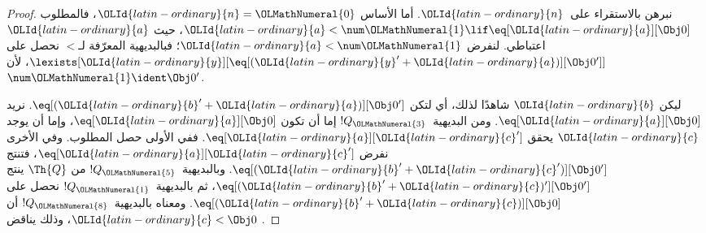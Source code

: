 \documentclass[../../../include/open-logic-section]{subfiles}
\begin{document}
\begin{proof}
نبرهن بالاستقراء على~$\OLId{latin-ordinary}{n}$. أما الأساس $\OLId{latin-ordinary}{n}=\OLMathNumeral{0}$، فالمطلوب
$\OLId{latin-ordinary}{a}<\num \OLMathNumeral{1}\lif\eq[\OLId{latin-ordinary}{a}][\Obj 0]$، حيث $\OLId{latin-ordinary}{a}$ اعتباطي.
لنفرض $\OLId{latin-ordinary}{a}<\num \OLMathNumeral{1}$؛ فبالبديهية المعرّفة لـ$<$ نحصل على
$\lexists[\OLId{latin-ordinary}{y}][\eq[(\OLId{latin-ordinary}{y}'+\OLId{latin-ordinary}{a})][\Obj 0']]$، لأن
$\num \OLMathNumeral{1}\ident\Obj 0'$.

ليكن $\OLId{latin-ordinary}{b}$ شاهدًا لذلك، أي لتكن
$\eq[(\OLId{latin-ordinary}{b}'+\OLId{latin-ordinary}{a})][\Obj 0']$. نريد $\eq[\OLId{latin-ordinary}{a}][\Obj 0]$.
ومن البديهية~$!Q_\OLMathNumeral{3}$ إما أن تكون $\eq[\OLId{latin-ordinary}{a}][\Obj 0]$،
وإما أن يوجد $\OLId{latin-ordinary}{c}$ يحقق $\eq[\OLId{latin-ordinary}{a}][\OLId{latin-ordinary}{c}']$.
ففي الأولى حصل المطلوب. وفي الأخرى نفرض $\eq[\OLId{latin-ordinary}{a}][\OLId{latin-ordinary}{c}']$،
فتنتج $\eq[(\OLId{latin-ordinary}{b}'+\OLId{latin-ordinary}{c}')][\Obj 0']$.
وبالبديهية~$!Q_\OLMathNumeral{5}$ من $\Th{Q}$ ينتج
$\eq[(\OLId{latin-ordinary}{b}'+\OLId{latin-ordinary}{c})'][\Obj 0']$، ثم بالبديهية~$!Q_\OLMathNumeral{1}$ نحصل على
$\eq[(\OLId{latin-ordinary}{b}'+\OLId{latin-ordinary}{c})][\Obj 0]$. ومعناه بالبديهية~$!Q_\OLMathNumeral{8}$ أن
$\OLId{latin-ordinary}{c}<\Obj 0$، وذلك يناقض .


\end{proof}
\end{document}
